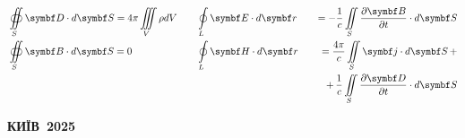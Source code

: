 {\begin{alwayssingle}
\begin{center}
\begin{tcolorbox}
			]
			\centering
			\Huge\sffamily\bfseries\textcolor{white}{\realtitle}\\
			\huge\sffamily\bfseries\textcolor{white}{\subtitle}
			\end{tcolorbox}
			\vfill
		 	\begin{Large}\color{themecolordark!90!black}
			\begin{alignat*}{4}
					&\oiint\limits_S \Dfield\cdot d\vect{S} = 4\pi\iiint\limits_V\rho dV  \quad
					&&\oint\limits_L \Efield\cdot d\vect{r} &&&= - \frac1c \iint\limits_S \frac{\partial\Bfield}{\partial t}\cdot d\vect{S} \\
					&\oiint\limits_S \Bfield\cdot d\vect{S} = 0
					 \quad
					&&\oint\limits_L \Hfield\cdot d\vect{r} &&& =\dfrac{4\pi}{c} \iint\limits_S \vect{j}\cdot d\vect{S} \,+ \\
					& && &&& +\,\frac{1}{c} \iint\limits_S  \frac{\partial\Dfield}{\partial t}\cdot d\vect{S}
			\end{alignat*}
			\end{Large}
			\vfill
			\begin{tcolorbox}[titlepagestyle,
					toprule=0.10cm,
					bottomrule=0.10cm]
				\begin{center}\color{white}\bfseries\normalsize
					\MakeUppercase{Київ~2025} \\
				\end{center}
			\end{tcolorbox}
		\end{center}
		\clearpage
	\end{alwayssingle}
\setcounter{page}{1}
}


%
%

